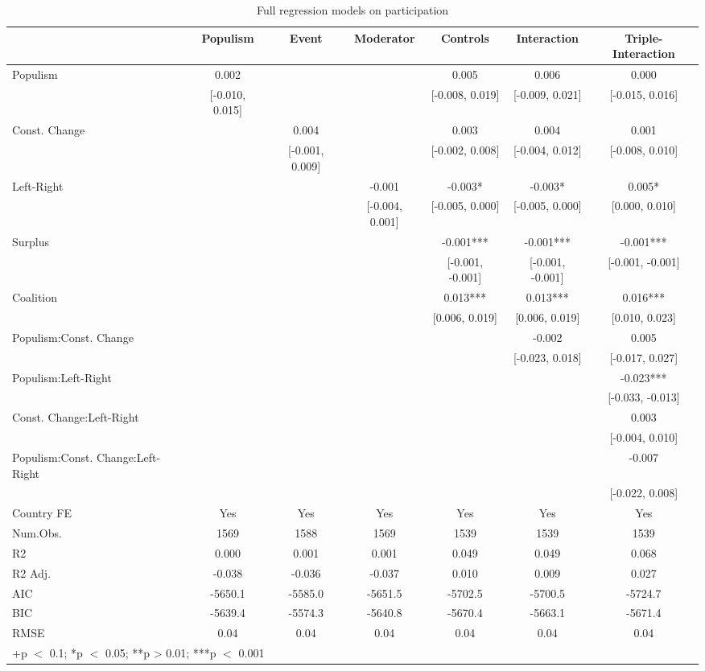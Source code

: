\documentclass[
  abstract]{article}
\begin{document}
\renewcommand{\arraystretch}{0.5}
\setlength{\tabcolsep}{2pt}

\hypertarget{tbl-partip}{}
\begin{table}
\caption{\label{tbl-partip}Full regression models on participation }\tabularnewline

\centering\centering\centering
\begin{tabular}[t]{lcccccc}
\toprule
  & Populism & Event & Moderator & Controls & Interaction & Triple-Interaction\\
\midrule
Populism & 0.002 &  &  & 0.005 & 0.006 & 0.000\\
 & {}[-0.010, 0.015] &  &  & {}[-0.008, 0.019] & {}[-0.009, 0.021] & {}[-0.015, 0.016]\\
Const. Change &  & 0.004 &  & 0.003 & 0.004 & 0.001\\
 &  & {}[-0.001, 0.009] &  & {}[-0.002, 0.008] & {}[-0.004, 0.012] & {}[-0.008, 0.010]\\
Left-Right &  &  & -0.001 & -0.003* & -0.003* & 0.005*\\
 &  &  & {}[-0.004, 0.001] & {}[-0.005, 0.000] & {}[-0.005, 0.000] & {}[0.000, 0.010]\\
Surplus &  &  &  & -0.001*** & -0.001*** & -0.001***\\
 &  &  &  & {}[-0.001, -0.001] & {}[-0.001, -0.001] & {}[-0.001, -0.001]\\
Coalition &  &  &  & 0.013*** & 0.013*** & 0.016***\\
 &  &  &  & {}[0.006, 0.019] & {}[0.006, 0.019] & {}[0.010, 0.023]\\
Populism:Const. Change &  &  &  &  & -0.002 & 0.005\\
 &  &  &  &  & {}[-0.023, 0.018] & {}[-0.017, 0.027]\\
Populism:Left-Right &  &  &  &  &  & -0.023***\\
 &  &  &  &  &  & {}[-0.033, -0.013]\\
Const. Change:Left-Right &  &  &  &  &  & 0.003\\
 &  &  &  &  &  & {}[-0.004, 0.010]\\
Populism:Const. Change:Left-Right &  &  &  &  &  & -0.007\\
 &  &  &  &  &  & {}[-0.022, 0.008]\\
\midrule
Country FE & Yes & Yes & Yes & Yes & Yes & Yes\\
Num.Obs. & 1569 & 1588 & 1569 & 1539 & 1539 & 1539\\
R2 & 0.000 & 0.001 & 0.001 & 0.049 & 0.049 & 0.068\\
R2 Adj. & -0.038 & -0.036 & -0.037 & 0.010 & 0.009 & 0.027\\
AIC & -5650.1 & -5585.0 & -5651.5 & -5702.5 & -5700.5 & -5724.7\\
BIC & -5639.4 & -5574.3 & -5640.8 & -5670.4 & -5663.1 & -5671.4\\
RMSE & 0.04 & 0.04 & 0.04 & 0.04 & 0.04 & 0.04\\
\bottomrule
\multicolumn{7}{l}{\rule{0pt}{1em}+p $<$ 0.1; *p $<$ 0.05; **p > 0.01; ***p $<$ 0.001}\\
\end{tabular}
\end{table}
\end{document}

